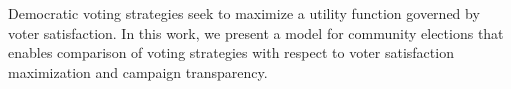 Democratic voting strategies seek to maximize a utility function governed
by voter satisfaction. In this work, we present a model for community
elections that enables comparison of voting strategies with respect to 
voter satisfaction maximization and campaign transparency. 


